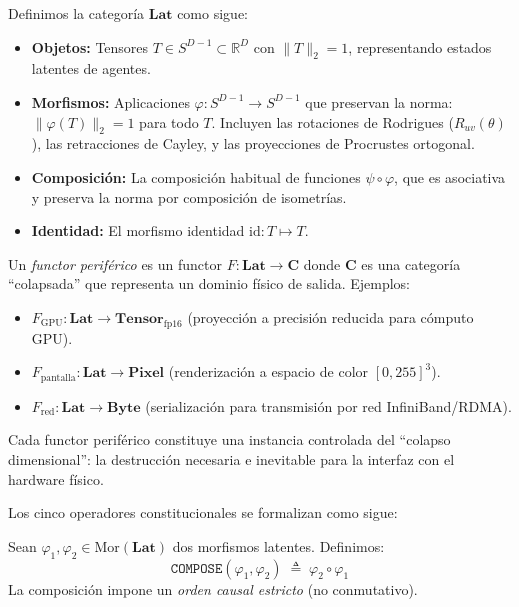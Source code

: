 \begin{definition}
\label{def:lat_category}
Definimos la categoría $\mathbf{Lat}$ como sigue:
\begin{itemize}
    \item \textbf{Objetos:} Tensores $T \in S^{D-1} \subset \mathbb{R}^D$ 
    con $\|T\|_2 = 1$, representando estados latentes de agentes.
    \item \textbf{Morfismos:} Aplicaciones $\varphi: S^{D-1} \to S^{D-1}$ 
    que preservan la norma: $\|\varphi(T)\|_2 = 1$ para todo $T$. 
    Incluyen las rotaciones de Rodrigues ($R_{uv}(\theta)$), las 
    retracciones de Cayley, y las proyecciones de Procrustes ortogonal.
    \item \textbf{Composición:} La composición habitual de funciones 
    $\psi \circ \varphi$, que es asociativa y preserva la norma por 
    composición de isometrías.
    \item \textbf{Identidad:} El morfismo identidad $\text{id}: T \mapsto T$.
\end{itemize}
\end{definition}

\begin{definition}
\label{def:peripheral_functor}
Un \emph{functor periférico} es un functor $F: \mathbf{Lat} \to \mathbf{C}$
donde $\mathbf{C}$ es una categoría ``colapsada'' que representa un dominio
físico de salida. Ejemplos:
\begin{itemize}
    \item $F_{\text{GPU}}: \mathbf{Lat} \to \mathbf{Tensor}_{\text{fp16}}$ 
    (proyección a precisión reducida para cómputo GPU).
    \item $F_{\text{pantalla}}: \mathbf{Lat} \to \mathbf{Pixel}$ 
    (renderización a espacio de color $[0,255]^3$).
    \item $F_{\text{red}}: \mathbf{Lat} \to \mathbf{Byte}$ 
    (serialización para transmisión por red InfiniBand/RDMA).
\end{itemize}
Cada functor periférico constituye una instancia controlada del
``colapso dimensional'': la destrucción necesaria e inevitable para la 
interfaz con el hardware físico.
\end{definition}

Los cinco operadores constitucionales se formalizan como sigue:

\begin{definition}
\label{def:compose}
Sean $\varphi_1, \varphi_2 \in \text{Mor}(\mathbf{Lat})$ dos morfismos
latentes. Definimos:
\begin{equation}
\texttt{COMPOSE}(\varphi_1, \varphi_2) \;\triangleq\; \varphi_2 \circ \varphi_1
\end{equation}
La composición impone un \emph{orden causal estricto} (no conmutativo).
\end{definition}


